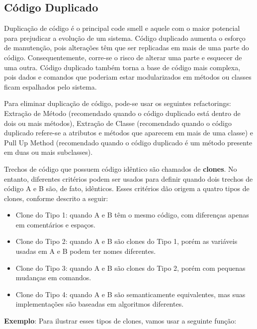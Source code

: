 \documentclass[
  11pt,
  twoside]{book}
\begin{document}
\hypertarget{cuxf3digo-duplicado}{%
\subsection{Código Duplicado}\label{cuxf3digo-duplicado}}

 

Duplicação de código é o principal code smell e aquele com o maior
potencial para prejudicar a evolução de um sistema. Código duplicado
aumenta o esforço de manutenção, pois alterações têm que ser replicadas
em mais de uma parte do código. Consequentemente, corre-se o risco de
alterar uma parte e esquecer de uma outra. Código duplicado também torna
a base de código mais complexa, pois dados e comandos que poderiam estar
modularizados em métodos ou classes ficam espalhados pelo sistema.

Para eliminar duplicação de código, pode-se usar os seguintes
refactorings: Extração de Método (recomendado quando o código duplicado
está dentro de dois ou mais métodos), Extração de Classe (recomendado
quando o código duplicado refere-se a atributos e métodos que aparecem
em mais de uma classe) e Pull Up Method (recomendado quando o código
duplicado é um método presente em duas ou mais subclasses).

 
 Trechos de código que possuem
código idêntico são chamados de \textbf{clones}. No entanto, diferentes
critérios podem ser usados para definir quando dois trechos de código A
e B são, de fato, idênticos. Esses critérios dão origem a quatro tipos
de clones, conforme descrito a seguir:

\begin{itemize}
\item
  Clone do Tipo 1: quando A e B têm o mesmo código, com diferenças
  apenas em comentários e espaços.
\item
  Clone do Tipo 2: quando A e B são clones do Tipo 1, porém as variáveis
  usadas em A e B podem ter nomes diferentes.
\item
  Clone do Tipo 3: quando A e B são clones do Tipo 2, porém com pequenas
  mudanças em comandos.
\item
  Clone do Tipo 4: quando A e B são semanticamente equivalentes, mas
  suas implementações são baseadas em algoritmos diferentes.
\end{itemize}

\textbf{Exemplo}: Para ilustrar esses tipos de clones, vamos usar a
seguinte função:
\end{document}

